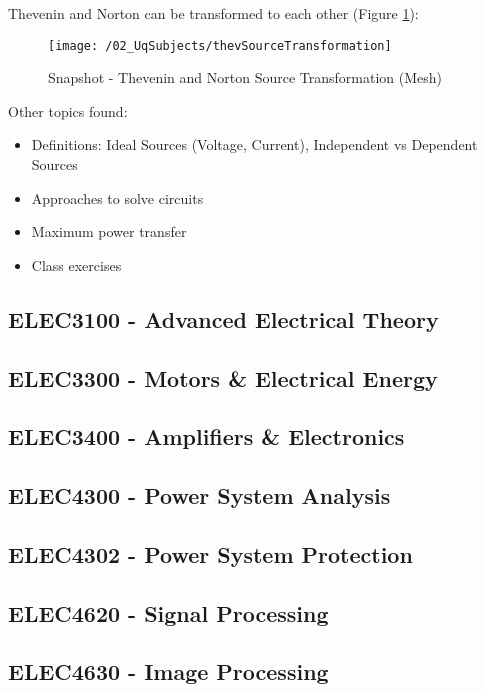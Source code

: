Thevenin and Norton can be transformed to each other (Figure \ref{fig_theveninSourceTrans}):
\begin{figure}
  \texttt{[image: /02\_UqSubjects/thevSourceTransformation]}
  \caption{Snapshot - Thevenin and Norton Source Transformation (Mesh)}
  \label{fig_theveninSourceTrans}
\end{figure}

Other topics found:
\begin{itemize}
  \item Definitions: Ideal Sources (Voltage, Current), Independent vs Dependent Sources
  \item Approaches to solve circuits
  \item Maximum power transfer
  \item Class exercises
\end{itemize}


\clearpage

\subsection{ELEC3100 - Advanced Electrical Theory}
\clearpage

\subsection{ELEC3300 - Motors \& Electrical Energy}
\clearpage

\subsection{ELEC3400 - Amplifiers \& Electronics}
\clearpage

\subsection{ELEC4300 - Power System Analysis}
\clearpage

\subsection{ELEC4302 - Power System Protection}
\clearpage

\subsection{ELEC4620 - Signal Processing}
\clearpage

\subsection{ELEC4630 - Image Processing}
\clearpage

